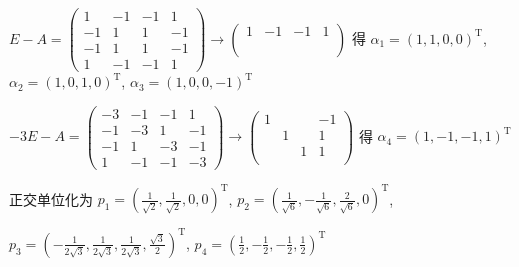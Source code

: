 \begin{enumerate}
                   \( E-A = \begin{pmatrix}
                       1  & -1 & -1 & 1  \\
                       -1 & 1  & 1  & -1 \\
                       -1 & 1  & 1  & -1 \\
                       1  & -1 & -1 & 1
                   \end{pmatrix} \rightarrow \begin{pmatrix}
                       1 & -1 & -1 & 1 \\
                         &    &    &   \\
                         &    &    &   \\
                         &    &    &
                   \end{pmatrix} \) 得 \( \alpha_{1} = (1, 1, 0, 0)^{\mathrm{T}} \), \( \alpha_{2} = (1, 0, 1, 0)^{\mathrm{T}} \), \( \alpha_{3} = (1, 0, 0, -1)^{\mathrm{T}} \)

                   \( -3E-A = \begin{pmatrix}
                       -3 & -1 & -1 & 1  \\
                       -1 & -3 & 1  & -1 \\
                       -1 & 1  & -3 & -1 \\
                       1  & -1 & -1 & -3
                   \end{pmatrix} \rightarrow \begin{pmatrix}
                       1 &   &   & -1 \\
                         & 1 &   & 1  \\
                         &   & 1 & 1  \\
                         &   &   &
                   \end{pmatrix} \) 得 \( \alpha_{4} = (1, -1, -1, 1)^{\mathrm{T}} \)

                   正交单位化为 \( p_{1} = \left( \frac{1}{\sqrt{2}}, \frac{1}{\sqrt{2}}, 0, 0 \right)^{\mathrm{T}} \), \( p_{2} = \left( \frac{1}{\sqrt{6}}, -\frac{1}{\sqrt{6}}, \frac{2}{\sqrt{6}}, 0 \right)^{\mathrm{T}} \),

                   \( p_{3} = \left( -\frac{1}{2\sqrt{3}}, \frac{1}{2\sqrt{3}}, \frac{1}{2\sqrt{3}}, \frac{\sqrt{3}}{2} \right)^{\mathrm{T}} \), \( p_{4} = \left( \frac{1}{2}, -\frac{1}{2}, -\frac{1}{2}, \frac{1}{2} \right)^{\mathrm{T}} \)


\end{enumerate}
